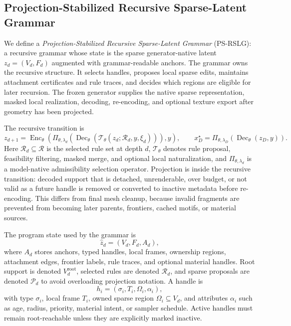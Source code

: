 \subsection{Projection-Stabilized Recursive Sparse-Latent Grammar}
We define a \emph{Projection-Stabilized Recursive Sparse-Latent Grammar} (PS-RSLG): a recursive grammar whose state is the sparse generator-native latent $z_d=(V_d,F_d)$ augmented with grammar-readable anchors. The grammar owns the recursive structure. It selects handles, proposes local sparse edits, maintains attachment certificates and rule traces, and decides which regions are eligible for later recursion. The frozen generator supplies the native sparse representation, masked local realization, decoding, re-encoding, and optional texture export after geometry has been projected.

The recursive transition is
\[
z_{d+1}=
\operatorname{Enc}_{\theta}\!\left(
\Pi_{\theta,\lambda_d}\!\left(
\operatorname{Dec}_{\theta}
\left(
\mathcal T_{\theta}(z_d;\mathcal R_d,y,\xi_d)
\right)
\right),
y
\right),
\qquad
x_D^\star=\Pi_{\theta,\lambda_D}\!\left(\operatorname{Dec}_{\theta}(z_D,y)\right).
\]
Here $\mathcal R_d\subseteq\mathcal R$ is the selected rule set at depth $d$, $\mathcal T_{\theta}$ denotes rule proposal, feasibility filtering, masked merge, and optional local naturalization, and $\Pi_{\theta,\lambda_d}$ is a model-native admissibility selection operator. Projection is inside the recursive transition: decoded support that is detached, unrenderable, over budget, or not valid as a future handle is removed or converted to inactive metadata before re-encoding. This differs from final mesh cleanup, because invalid fragments are prevented from becoming later parents, frontiers, cached motifs, or material sources.

The program state used by the grammar is
\[
\hat z_d=(V_d,F_d,A_d),
\]
where $A_d$ stores anchors, typed handles, local frames, ownership regions, attachment edges, frontier labels, rule traces, and optional material handles. Root support is denoted $V_d^{\mathrm{root}}$, selected rules are denoted $\mathcal R_d$, and sparse proposals are denoted $\mathcal P_d$ to avoid overloading projection notation. A handle is
\[
h_i=(\sigma_i,T_i,\Omega_i,\alpha_i),
\]
with type $\sigma_i$, local frame $T_i$, owned sparse region $\Omega_i\subseteq V_d$, and attributes $\alpha_i$ such as age, radius, priority, material intent, or sampler schedule. Active handles must remain root-reachable unless they are explicitly marked inactive.

